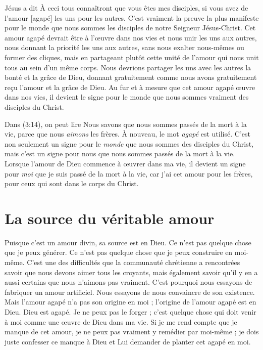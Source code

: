 Jésus a dit\frcolon{}
 \Og À ceci tous connaîtront que vous êtes mes disciples,
 si vous avez de l'amour [agapé] les uns pour les autres. \Fg{}
 C'est vraiment la preuve la plus manifeste pour le monde
 que nous sommes les disciples de notre Seigneur Jésus-Christ.
 Cet amour agapé devrait être à l'œuvre dans nos vies
 et nous unir les uns aux autres,
 nous donnant la priorité les uns aux autres,
 sans nous exalter nous-mêmes ou former des cliques,
 mais en partageant plutôt cette unité de l'amour qui
 nous unit tous au sein d'un même corps.
 Nous devrions partager les uns avec les autres la bonté et la grâce de Dieu,
 donnant gratuitement comme nous avons gratuitement reçu l'amour
 et la grâce de Dieu.
 Au fur et à mesure que cet amour agapé
 \oe{}uvre dans nos vies,
 il devient le signe pour le monde que nous sommes vraiment
 des disciples du Christ.

Dans (3:14), on peut lire\frcolon{}
 \Og Nous savons que nous sommes passés de la mort à la vie,
 parce que nous \emph{aimons} les frères. \Fg{}
 À nouveau, le mot \emph{agapé} est utilisé.
 C'est non seulement un signe pour le \emph{monde}
 que nous sommes des disciples du Christ, mais c'est un signe pour nous
 que nous sommes passés de la mort à la vie.
 Lorsque l'amour de Dieu commence à \oe{}uvrer dans ma vie,
 il devient un signe pour \emph{moi} que je suis passé de la mort à la vie,
 car j'ai cet amour pour les frères, pour ceux qui sont
 dans le corps du Christ.


\section{La source du v\'eritable amour}

Puisque c'est un amour divin, sa source est en Dieu.
 Ce n'est pas quelque chose que je peux générer.
 Ce n'est pas quelque chose que je peux construire en moi-même.
 C'est une des difficultés que la communauté chrétienne a rencontrées\frcolon{}
 savoir que nous devons aimer tous les croyants, mais également savoir
 qu'il y en a aussi certains que nous n'aimons pas vraiment.
 C'est pourquoi nous essayons de fabriquer un amour artificiel.
 Nous essayons de nous convaincre de son existence.
 Mais l'amour agapé n'a pas son origine en moi ;
 l'origine de l'amour agapé est en Dieu. Dieu est agapé.
 Je ne peux pas le forger ; c'est quelque chose qui doit venir à moi
 comme une œuvre de Dieu dans ma vie.
 Si je me rend compte que je manque de cet amour, je ne peux pas vraiment
 y remédier par moi-même ; je dois juste confesser ce manque à Dieu
 et Lui demander de planter cet agapé en moi.


